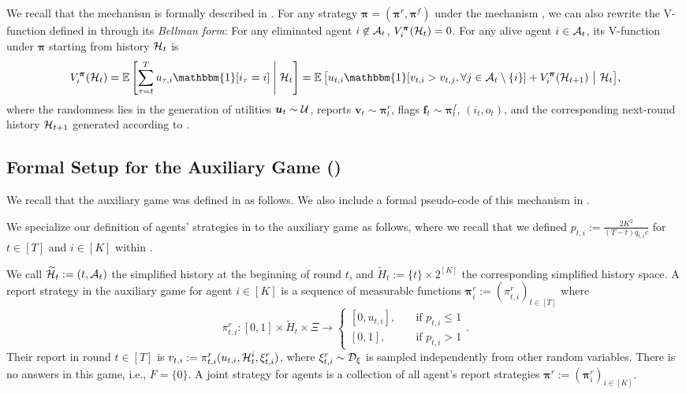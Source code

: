 We recall that the mechanism \mechname is formally described in . For any strategy $\bm \pi=(\bm \pi^r,\bm \pi^f)$ under the mechanism \mechname, we can also rewrite the V-function defined in  through its \textit{Bellman form}: For any eliminated agent $i\not \in \mathcal{A}_t$, $V_i^{\bm \pi}(\mathcal{H}_t)=0$. For any alive agent $i\in \mathcal{A}_t$, its V-function under $\bm \pi$ starting from history $\mathcal{H}_t$ is
\begin{align}
V_i^{\bm \pi}(\mH_t)=\E\left [\sum_{\tau=t}^T u_{\tau,i}\mathbbm{1}[i_{\tau}=i]\middle \vert \mH_t\right ]=\E\big [u_{t,i}\mathbbm{1}[v_{t,i}>v_{t,j},\forall j\in \mA_t\setminus \{i\}]+V_i^{\bm \pi}(\mH_{t+1})~\big \vert ~ \mH_t\big ],\label{eq:V-func recursive}
\end{align}
where the randomness lies in the generation of utilities $\bm u_t\sim \mathcal{U}$, reports $\bm v_t\sim \bm \pi_t^r$, flags $\bm f_t\sim \bm \pi_t^f$, $(i_t,o_t)$, and the corresponding next-round history $\mathcal{H}_{t+1}$ generated according to .

\subsection{Formal Setup for the Auxiliary Game ()}\label{sec:appendix auxiliary game}
We recall that the auxiliary game was defined in  as follows. We also include a formal pseudo-code of this mechanism in . 

We specialize our definition of agents' strategies in  to the auxiliary game as follows, where we recall that we defined $p_{t,i}:= \frac{2K^2}{(T-t)q_{t,i} c} $ for $t\in[T]$ and $i\in[K]$ within .
\begin{definition}
We call $\widetilde {\mathcal{H}}_t:= (t,\mathcal{A}_t)$ the simplified history at the beginning of round $t$, and $\tilde H_t:=\{t\}\times 2^{[K]}$ the corresponding simplified history space.
A {report strategy} in the auxiliary game  for agent $i\in[K]$ is a sequence of measurable functions $\bm\pi_i^r:=(\pi^r_{t,i})_{t\in[T]}$ where
\begin{equation*}
\pi^r_{t,i}:[0,1]\times \tilde H_t\times \Xi \to \begin{cases}
[0,u_{t,i}],&\quad \text{if }p_{t,i}\leq 1\\
[0,1],&\quad \text{if }p_{t,i}> 1
\end{cases}.
\end{equation*}
Their report in round $t\in[T]$ is $v_{t,i}:=\pi^r_{t,i}(u_{t,i},\mathcal{H}_t^i,\xi^r_{t,i})$, where $\xi^r_{t,i}\sim\mathcal{D}_\xi$ is sampled independently from other random variables. There is no answers in this game, i.e., $F=\{0\}$.
A {joint strategy} for agents is a collection of all agent's report strategies $\bm\pi^r:=(\bm \pi_{i}^r)_{i\in[K]}$.
\end{definition}

